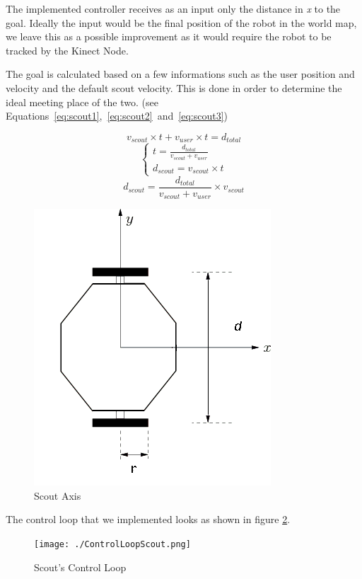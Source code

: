 The implemented controller receives as an input only the distance in \textit{x} to the goal. Ideally the input would be the final position of the robot in the world map, we leave this as a possible improvement as it would require the robot to be tracked by the Kinect Node.

The goal is calculated based on a few informations such as the user position and velocity and the default scout velocity. This is done in order to determine the ideal meeting place of the two. (see Equations~\ref{eq:scout1},~\ref{eq:scout2}~and~\ref{eq:scout3})

\begin{equation}
\label{eq:scout1}
v_{scout} \times t + v_{user} \times t = d_{total} 
\end{equation}
\begin{equation}
\label{eq:scout2}
\left\{
\begin{array}{l}
t = \frac{d_{total}}{v_{scout} + v_{user}}\\
d_{scout} = v_{scout} \times t
\end{array}
\right.
\end{equation}
\begin{equation}
\label{eq:scout3}
d_{scout} = \frac{d_{total}}{v_{scout} + v_{user}} \times v_{scout}
\end{equation}


\begin{figure}[!ht]
    \centering
    \includegraphics[width=0.5\columnwidth]{./ScoutAxis.png}
    \caption{Scout Axis}
    \label{fig:scout_axis}
\end{figure}

The control loop that we implemented looks as shown in figure \ref{fig:scout_loop}.

\begin{figure}[!ht]
    \centering
    \texttt{[image: ./ControlLoopScout.png]}
    \caption{Scout's Control Loop}
    \label{fig:scout_loop}
\end{figure}
